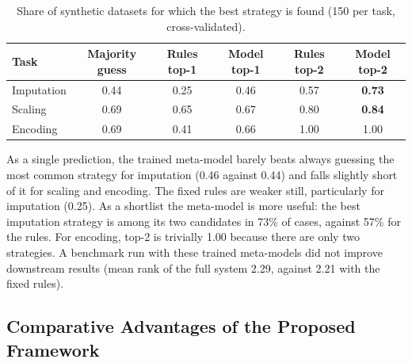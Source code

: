 \documentclass[11pt,a4paper]{article}
\begin{document}
\begin{table}[ht]
\centering
\caption{Share of synthetic datasets for which the best strategy is found (150 per task, cross-validated).}
\label{tab:metamodel}
\setlength{\tabcolsep}{4pt}
\begin{tabular}{lccccc}
\toprule
\textbf{Task} & \textbf{Majority guess} & \textbf{Rules top-1} & \textbf{Model top-1} & \textbf{Rules top-2} & \textbf{Model top-2} \\
\midrule
Imputation & 0.44 & 0.25 & 0.46 & 0.57 & \textbf{0.73} \\
Scaling & 0.69 & 0.65 & 0.67 & 0.80 & \textbf{0.84} \\
Encoding & 0.69 & 0.41 & 0.66 & 1.00 & 1.00 \\
\bottomrule
\end{tabular}
\end{table}

As a single prediction, the trained meta-model barely beats always guessing the most common strategy for imputation (0.46 against 0.44) and falls slightly short of it for scaling and encoding. The fixed rules are weaker still, particularly for imputation (0.25). As a shortlist the meta-model is more useful: the best imputation strategy is among its two candidates in 73\% of cases, against 57\% for the rules. For encoding, top-2 is trivially 1.00 because there are only two strategies. A benchmark run with these trained meta-models did not improve downstream results (mean rank of the full system 2.29, against 2.21 with the fixed rules).

\subsection{Comparative Advantages of the Proposed Framework}
\end{document}
